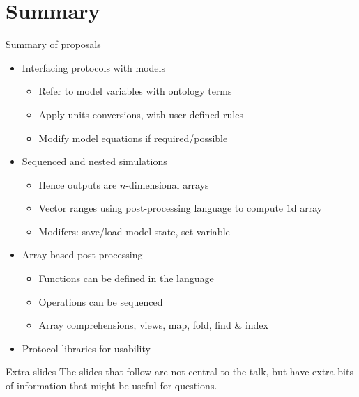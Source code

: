 \documentclass[t,xcolor={usenames,dvipsnames}]{beamer}
\begin{document}
\section{Summary}

\begin{frame}{Summary of proposals}
\begin{itemize}
\item Interfacing protocols with models
  \begin{itemize}
  \item Refer to model variables with ontology terms
  \item Apply units conversions, with user-defined rules
  \item Modify model equations if required/possible
  \end{itemize}
\item Sequenced and nested simulations
  \begin{itemize}
  \item Hence outputs are $n$-dimensional arrays
  \item Vector ranges using post-processing language to compute $1$d array
  \item Modifers: save/load model state, set variable
  \end{itemize}
\item Array-based post-processing
  \begin{itemize}
  \item Functions can be defined in the language
  \item Operations can be sequenced
  \item Array comprehensions, views, map, fold, find \& index
  \end{itemize}
\item Protocol libraries for usability
\end{itemize}
\end{frame}


\appendix

\begin{frame}{Extra slides}
The slides that follow are not central to the talk, but have extra bits
of information that might be useful for questions.
\end{frame}
\end{document}
